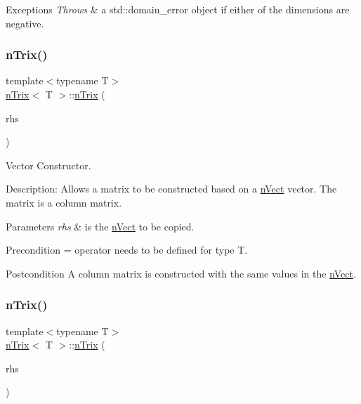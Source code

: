 \begin{DoxyExceptions}{Exceptions}
{\em Throws} & a std\+::domain\+\_\+error object if either of the dimensions are negative. \\
\hline
\end{DoxyExceptions}
\mbox{\label{classnTrix_a702b976039784b4b6d699c929f835270}} 
\subsubsection{\texorpdfstring{n\+Trix()}{nTrix()}\hspace{0.1cm}{\footnotesize\ttfamily [4/5]}}
{\footnotesize\ttfamily template$<$typename T$>$ \\
\hyperlink{classnTrix}{n\+Trix}$<$ T $>$\+::\hyperlink{classnTrix}{n\+Trix} (\begin{DoxyParamCaption}\item[{const \hyperlink{classnVect}{n\+Vect}$<$ T $>$ \&}]{rhs }\end{DoxyParamCaption})}



Vector Constructor. 

Description\+: Allows a matrix to be constructed based on a \hyperlink{classnVect}{n\+Vect} vector. The matrix is a column matrix. 
\begin{DoxyParams}{Parameters}
{\em rhs} & is the \hyperlink{classnVect}{n\+Vect} to be copied. \\
\hline
\end{DoxyParams}
\begin{DoxyPrecond}{Precondition}
= operator needs to be defined for type T. 
\end{DoxyPrecond}
\begin{DoxyPostcond}{Postcondition}
A column matrix is constructed with the same values in the \hyperlink{classnVect}{n\+Vect}. 
\end{DoxyPostcond}
\mbox{\label{classnTrix_a490ebc8fb7a94e577b33e05b16daafec}} 
\subsubsection{\texorpdfstring{n\+Trix()}{nTrix()}\hspace{0.1cm}{\footnotesize\ttfamily [5/5]}}
{\footnotesize\ttfamily template$<$typename T$>$ \\
\hyperlink{classnTrix}{n\+Trix}$<$ T $>$\+::\hyperlink{classnTrix}{n\+Trix} (\begin{DoxyParamCaption}\item[{const \hyperlink{classnTrix}{n\+Trix}$<$ T $>$ \&}]{rhs }\end{DoxyParamCaption})}



